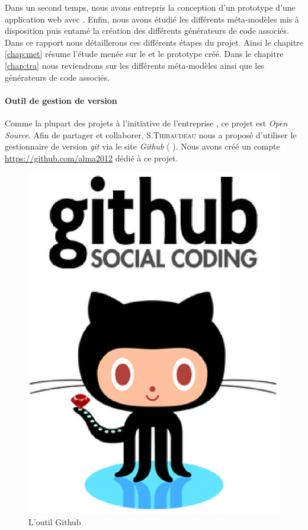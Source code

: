 \clearpage

Dans un second temps, nous avons entrepris la conception d'un prototype d'une application web avec \kwplay{}. Enfin, nous avons étudié les différents méta-modèles mis à disposition puis entamé la création des différents générateurs de code associés. Dans ce rapport nous détaillerons ces différents étapes du projet. Ainsi le chapitre \ref{chap:met} résume l'étude menée sur le \kwplay{} et le prototype créé. Dans le chapitre \ref{chap:tra} nous reviendrons sur les différents méta-modèles ainsi que les générateurs de code associés. 

\paragraph{Outil de gestion de version}
Comme la plupart des projets à l'initiative de l'entreprise \kwobeo, ce projet est \textit{Open Source}. Afin de partager et collaborer, S.\textsc{Thibaudeau} nous a proposé d'utiliser le gestionnaire de version \emph{git} via le site \emph{Github} (\cf{} \cite{git}).%
Nous avons créé un compte \href{alma2012}{https://github.com/alma2012} dédié à ce projet.

\begin{figure}[htb]
  \centering
  \includegraphics[scale=.3]{img/git.eps}
  \caption{L'outil Github}
\end{figure}

